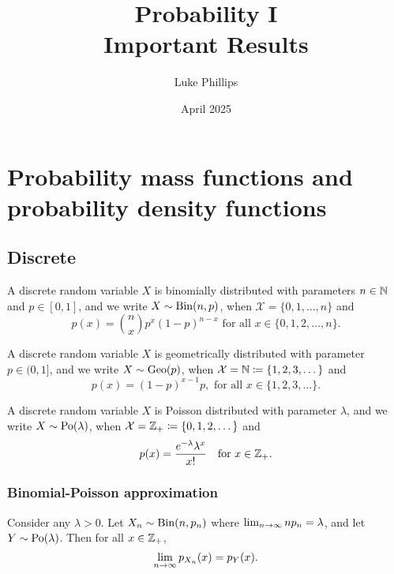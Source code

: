 \documentclass[10pt, a4paper]{article}
\title{Probability I \\
    \large Important Results}
\author{Luke Phillips}
\date{April 2025}
\begin{document}
\maketitle

\newpage

\tableofcontents

\newpage

\section{Probability mass functions and probability density functions}

\subsection{Discrete}

\begin{definition}
    A discrete random variable $X$ is binomially distributed with parameters $n \in \mathbb{N}$ and $p \in [0, 1]$,
    and we write $X \sim \operatorname{Bin}(n, p)$,
    when $\mathcal{X} = \{0, 1, \dotsc, n\}$ and
    \[
    p(x) = \binom{n}{x}p ^ x(1 - p) ^ {n - x}\text{ for all } x \in \{0, 1, 2, \dotsc, n\}.
    \]
\end{definition}

\begin{definition}
    A discrete random variable $X$ is geometrically distributed with parameter $p \in (0, 1]$,
    and we write $X \sim \operatorname{Geo}(p)$,
    when $\mathcal{X} = \mathbb{N} \coloneqq \{1, 2, 3, \dotsc\}$ and
    \[
    p(x) = (1 - p) ^ {x - 1}p,\text{ for all } x \in \{1, 2, 3, \dotsc\}.
    \]
\end{definition}

\begin{definition}
    A discrete random variable $X$ is Poisson distributed with parameter $\lambda$,
    and we write $X \sim \operatorname{Po}(\lambda)$,
    when $\mathcal{X} = \mathbb{Z}_{+} \coloneqq \{0, 1, 2, \dotsc\}$ and
    \[
    p(x) = \frac{e ^ {-\lambda}\lambda ^ x}{x!}\quad\text{for } x \in \mathbb{Z}_{+}.
    \]
\end{definition}

\subsubsection{Binomial-Poisson approximation}

\begin{theorem}
    Consider any $\lambda > 0$.
    Let $X_n \sim \operatorname{Bin}(n, p_n)$ where $\lim_{n \rightarrow \infty} np_n = \lambda$,
    and let $Y \sim \operatorname{Po}(\lambda)$.
    Then for all $x \in \mathbb{Z}_{+}$,
    \[
    \lim_{n \rightarrow \infty} p_{X_n}(x) = p_Y(x).
    \]
\end{theorem}
\end{document}
